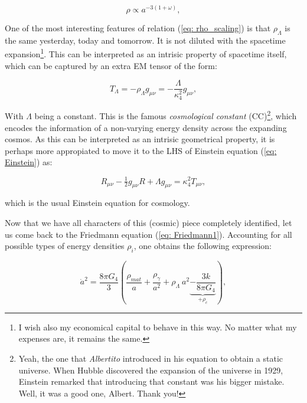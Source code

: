 \documentclass[11pt, a4paper]{article} %
\begin{document}
\begin{equation}\label{eq: rho_scaling}
	\rho \propto a^{-3\left(1+\omega\right)},
\end{equation}

One of the most interesting features of relation (\ref{eq: rho_scaling}) is that $\rho_{\Lambda}$ is the same yesterday, today and tomorrow. It is not diluted with the spacetime expansion\footnote{I wish also my economical capital to behave in this way. No matter what my expenses are, it remains the same.}. This can be interpreted as an intrisic property of spacetime itself, which can be captured by an extra EM tensor of the form:

\begin{equation}
	T_{\Lambda} = - \rho_{\Lambda}g_{\mu\nu} = - \frac{\Lambda}{\kappa^{2}_{4}} g_{\mu\nu},
\end{equation}

With $\Lambda$ being a constant. This is the famous \textit{cosmological constant} (CC)\footnote{Yeah, the one that \textit{Albertito} introduced in his equation to obtain a static universe. When Hubble discovered the expansion of the universe in 1929, Einstein remarked that introducing that constant was his bigger mistake. Well, it was a good one, Albert. Thank you!}, which encodes the information of a non-varying energy density across the expanding cosmos. As this can be interpreted as an intrisic geometrical property, it is perhaps more appropiated to move it to the LHS of Einstein equation (\ref{eq: Einstein}) as: 

\begin{equation}\label{eq: Einstein with Lambda}
	R_{\mu\nu} - \tfrac{1}{2} g_{\mu\nu} R + \Lambda g_{\mu\nu}  = \kappa^{2}_{4} T_{\mu \nu},
\end{equation}

which is the usual Einstein equation for cosmology. 

Now that we have all characters of this (cosmic) piece completely identified, let us come back to the Friedmann equation (\ref{eq: Friedmann1}). Accounting for all possible types of energy densities $\rho_{i}$, one obtains the following expression:

\begin{equation}\label{eq: thy_pot}
	\dot{a}^{2} = \frac{8 \pi G_{4}}{3} \left(\frac{\rho_{mat}}{a} + \frac{\rho_{\gamma}}{a^{2}} + \rho_{\Lambda} \:a^{2}\underbrace{- \frac{3 k}{8 \pi G_{4}}}_{+\rho_{c}}\right),
\end{equation}
\end{document}
